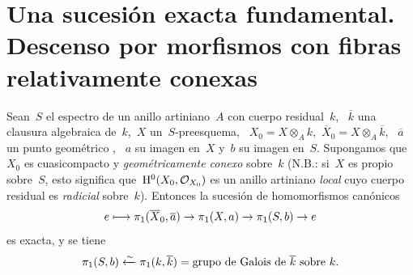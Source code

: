 \section[Una sucesión exacta fundamental]{Una sucesión exacta fundamental. Descenso por morfismos con
fibras relativamente conexas}
\label{IX.6}

\begin{theoreme}
\label{IX.6.1}
Sean~$S$ el espectro de un anillo artiniano~$A$ con cuerpo residual~$k$,
~$\overline{k}$ una clausura algebraica de~$k$,~$X$ un~$S$-preesquema,
~$X_0=X\otimes_A k$,~$\overline{X}_0=X\otimes_A\overline{k}$,
~$\overline{a}$ un punto geométrico
,
~$a$ su imagen en~$X$ y~$b$ su imagen en~$S$. Supongamos que~$X_0$ es
cuasicompacto y \emph{geométricamente conexo} sobre~$k$ (N.B.: si~$X$ es
propio sobre~$S$, esto significa que~$\mathrm H^0(X_0,\mathcal{O}_{X_0})$ es un anillo
artiniano \emph{local} cuyo cuerpo residual es \emph{radicial} sobre~$k$).
Entonces la sucesión de homomorfismos canónicos
$$
e\longmapsto \pi_1(\overline{X}_0,\overline{a})\to
\pi_1(X,a)\to\pi_1(S,b)\to e
$$
es exacta, y se tiene
$$
\pi_1(S,b)\xleftarrow{\sim} \pi_1(k,\overline{k})=\text{grupo de Galois
de~$\overline{k}$ sobre~$k$.}
$$
\end{theoreme}

